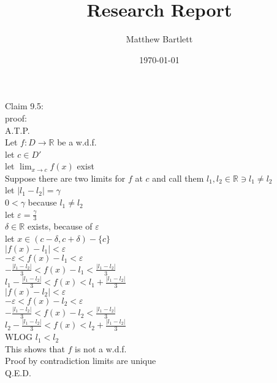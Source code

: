\documentclass[12pt]{article}
\begin{document}
	\author{Matthew Bartlett}
	\title{Research Report}
	\date{\today}
	\maketitle

	\null\qquad Claim 9.5:\\



	proof:\\
		A.T.P.\\
		Let $f:D\rightarrow\mathbb{R}$ be a w.d.f.\\
		let $c\in D'$\\
		let $\lim_{x\rightarrow c}f(x)$ exist\\
		Suppose there are two limits for $f$ at $c$ and call them $l_1,l_2\in\mathbb{R}\ni l_1\neq l_2$\\
		let $|l_1-l_2|=\gamma$\\
		$0<\gamma$ because $l_1\neq l_2$\\
		let $\varepsilon=\frac{\gamma}{3}$\\
		$\delta\in\mathbb{R}$ exists, because of $\varepsilon$\\
		let $x\in(c-\delta,c+\delta)-\{c\}$\\
		$|f(x)-l_1|<\varepsilon$\\
		$-\varepsilon<f(x)-l_1<\varepsilon$\\
		$-\frac{|l_1-l_2|}{3}<f(x)-l_1<\frac{|l_1-l_2|}{3}$\\
		$l_1-\frac{|l_1-l_2|}{3}<f(x)<l_1+\frac{|l_1-l_2|}{3}$\\
		$|f(x)-l_2|<\varepsilon$\\
		$-\varepsilon<f(x)-l_2<\varepsilon$\\
		$-\frac{|l_1-l_2|}{3}<f(x)-l_2<\frac{|l_1-l_2|}{3}$\\
		$l_2-\frac{|l_1-l_2|}{3}<f(x)<l_2+\frac{|l_1-l_2|}{3}$\\
		WLOG $l_1<l_2$\\
		This shows that $f$ is not a w.d.f.\\
		Proof by contradiction limits are unique\\
		Q.E.D.
\end{document}
